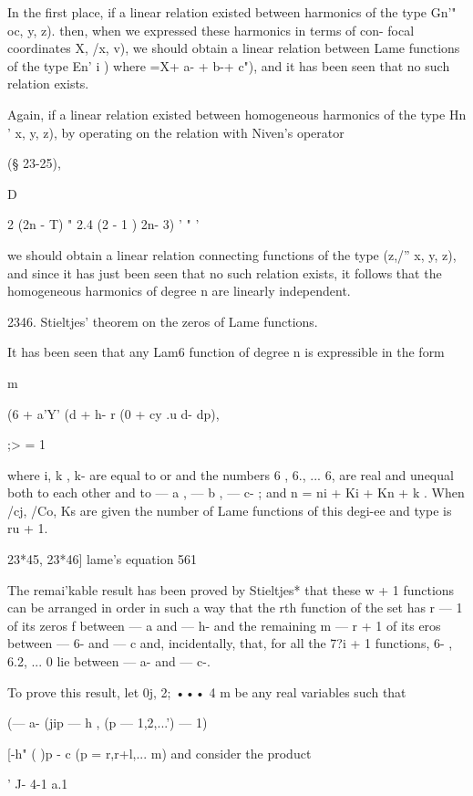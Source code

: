 {{{{{{{In the first place, if a linear relation existed between harmonics of the 
type Gn'"  oc, y, z). then, when we expressed these harmonics in terms of con- 
focal coordinates  X, /x, v), we should obtain a linear relation between Lame 
functions of the type En' i ) where  =X+   a- + b-+ c"), and it has been 
seen that no such relation exists. 

Again, if a linear relation existed between homogeneous harmonics of the 
type Hn '   x, y, z), by operating on the relation with Niven's operator 

(§ 23-25), 

  D\ 

2 (2n - T) " 2.4 (2  - 1 )  2n- 3) ' " ' 

we should obtain a linear relation connecting functions of the type (z,/''  x, y, z), 
and since it has just been seen that no such relation exists, it follows that the 
homogeneous harmonics of degree n are linearly independent. 

2346. Stieltjes' theorem on the zeros of Lame functions. 

It has been seen that any Lam6 function of degree n is expressible in the 
form 

m 

(6 + a'Y' (d + h- r (0 + cy  .u d- dp), 

;> = 1 

where  i, k , k-  are equal to or   and the numbers 6 , 6., ... 6,  are real and 
unequal both to each other and to — a , — b , — c- ; and  n = ni + Ki + Kn + k . 
When /cj, /Co, Ks are given the number of Lame functions of this degi-ee and 
type is ru + 1. 



23*45, 23*46] lame's equation 561 

The remai'kable result has been proved by Stieltjes* that these w + 1 
functions can be arranged in order in such a way that the rth function of the 
set has r — 1 of its zeros f between — a  and — h- and the remaining m — r + 1 
of its  eros between — 6- and — c  and, incidentally, that, for all the 7?i + 1 
functions, 6- , 6.2, ... 0  lie between — a- and — c-. 

To prove this result, let 0j,  2; ••• 4 m be any real variables such that 

(— a-  (jip  — h , (p — 1,2,...') — 1) 

[-h" ( )p - c  (p = r,r+l,... m) 
and consider the product 

 ' J- 4-1 a.1 

}}}}}}}
